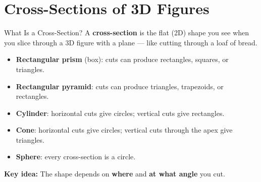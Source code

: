 \section{Cross-Sections of 3D Figures}

\begin{quickReview}{What Is a Cross-Section?}
A \textbf{cross-section} is the flat (2D) shape you see when you slice through a 3D figure with a plane — like cutting through a loaf of bread.

\begin{itemize}[leftmargin=*]
    \item \textbf{Rectangular prism} (box): cuts can produce rectangles, squares, or triangles.
    \item \textbf{Rectangular pyramid}: cuts can produce triangles, trapezoids, or rectangles.
    \item \textbf{Cylinder}: horizontal cuts give circles; vertical cuts give rectangles.
    \item \textbf{Cone}: horizontal cuts give circles; vertical cuts through the apex give triangles.
    \item \textbf{Sphere}: every cross-section is a circle.
\end{itemize}

\medskip
\textbf{Key idea:} The shape depends on \textbf{where} and \textbf{at what angle} you cut.
\end{quickReview}

